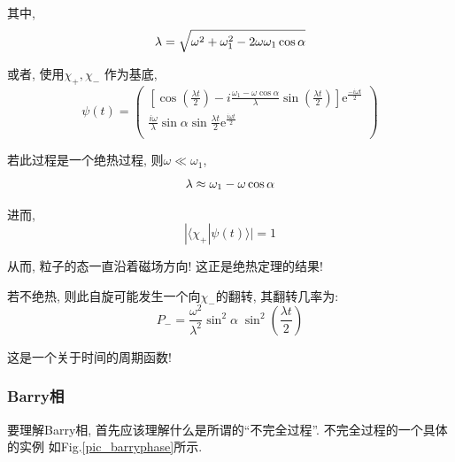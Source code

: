 \documentclass[a4paper, 11pt]{article}
\begin{document}
\begin{spacing}{1.2}
        其中, 
        \begin{equation}
          \lambda = \sqrt{\omega^2+\omega_1^2-2\omega\omega_1\cos\alpha} \notag
        \end{equation}

        或者, 使用$\chi_+, \chi_-$ 作为基底,  
        \begin{equation}
          \psi(t) = \left(
            \begin{array}{c}
              [\cos(\frac{\lambda{}t}{2})-i\frac{\omega_1-\omega\cos\alpha}{\lambda}
              \sin(\frac{\lambda{}t}{2})]
              \mathrm{e}^\frac{-i\omega{}t}{2} \\
              
              \frac{i\omega}{\lambda}\sin\alpha\sin\frac{\lambda{}t}{2}
              \mathrm{e}^\frac{i\omega{}t}{2} \\
            \end{array} \right)
        \end{equation}
        
        若此过程是一个绝热过程, 则$\omega \ll \omega_1$,
        \begin{equation}
          \lambda \approx \omega_1-\omega\cos\alpha \notag
        \end{equation}

        进而, 
        \begin{equation}
          |\langle\chi_+|\psi(t)\rangle| = 1
        \end{equation}

        从而, 粒子的态一直沿着磁场方向! 这正是绝热定理的结果!

        若不绝热, 则此自旋可能发生一个向$\chi_-$的翻转, 其翻转几率为:
        \begin{equation}
          P_- = \frac{\omega^2}{\lambda^2}\sin^2\alpha\;\sin^2(\frac{\lambda{}t}{2})
        \end{equation}

        这是一个关于时间的周期函数!

      \subsubsection{Barry相}
        要理解Barry相, 首先应该理解什么是所谓的``不完全过程''. 不完全过程的一个具体的实例
        如Fig.\ref{pic_barryphase}所示.


\end{spacing}
\end{document}
